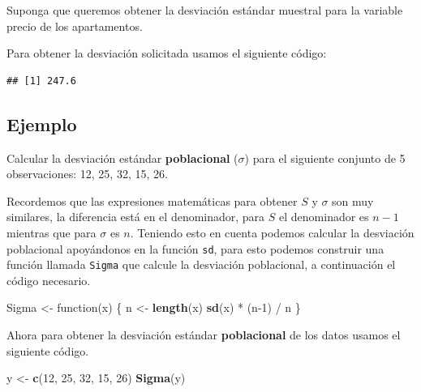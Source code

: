 \documentclass[10pt,]{krantz}
\makeatletter
\newenvironment{Shaded}{\begin{snugshade}}{\end{snugshade}}
\newcommand{\KeywordTok}[1]{\textcolor[rgb]{0.13,0.29,0.53}{\textbf{{#1}}}}
\newcommand{\DataTypeTok}[1]{\textcolor[rgb]{0.13,0.29,0.53}{{#1}}}
\newcommand{\DecValTok}[1]{\textcolor[rgb]{0.00,0.00,0.81}{{#1}}}
\newcommand{\StringTok}[1]{\textcolor[rgb]{0.31,0.60,0.02}{{#1}}}
\newcommand{\NormalTok}[1]{{#1}}
\newenvironment{kframe}{%
\medskip{}
\setlength{\fboxsep}{.8em}
 \def\at@end@of@kframe{}%
 \ifinner\ifhmode%
  \def\at@end@of@kframe{\end{minipage}}%
  \begin{minipage}{\columnwidth}%
 \fi\fi%
 \def\FrameCommand##1{\hskip\@totalleftmargin \hskip-\fboxsep
 \colorbox{shadecolor}{##1}\hskip-\fboxsep
     \hskip-\linewidth \hskip-\@totalleftmargin \hskip\columnwidth}%
 \MakeFramed {\advance\hsize-\width
   \@totalleftmargin\z@ \linewidth\hsize
   \@setminipage}}%
 {\par\unskip\endMakeFramed%
 \at@end@of@kframe}
\renewenvironment{Shaded}{\begin{kframe}}{\end{kframe}}
\makeatother
\begin{document}
Suponga que queremos obtener la desviación estándar muestral para la
variable precio de los apartamentos.

Para obtener la desviación solicitada usamos el siguiente código:

\begin{Shaded}
\end{Shaded}

\begin{verbatim}
## [1] 247.6
\end{verbatim}

\subsection*{Ejemplo}\label{ejemplo-38}


Calcular la desviación estándar \textbf{poblacional} (\(\sigma\)) para
el siguiente conjunto de 5 observaciones: 12, 25, 32, 15, 26.

Recordemos que las expresiones matemáticas para obtener \(S\) y
\(\sigma\) son muy similares, la diferencia está en el denominador, para
\(S\) el denominador es \(n-1\) mientras que para \(\sigma\) es \(n\).
Teniendo esto en cuenta podemos calcular la desviación poblacional
apoyándonos en la función \texttt{sd}, para esto podemos construir una
función llamada \texttt{Sigma} que calcule la desviación poblacional, a
continuación el código necesario.

\begin{Shaded}
\begin{Highlighting}[]
\NormalTok{Sigma <-}\StringTok{ }\NormalTok{function(x) \{}
  \NormalTok{n <-}\StringTok{ }\KeywordTok{length}\NormalTok{(x)}
  \KeywordTok{sd}\NormalTok{(x) *}\StringTok{ }\NormalTok{(n}\DecValTok{-1}\NormalTok{) /}\StringTok{ }\NormalTok{n}
\NormalTok{\} }
\end{Highlighting}
\end{Shaded}

Ahora para obtener la desviación estándar \textbf{poblacional} de los
datos usamos el siguiente código.

\begin{Shaded}
\begin{Highlighting}[]
\NormalTok{y <-}\StringTok{ }\KeywordTok{c}\NormalTok{(}\DecValTok{12}\NormalTok{, }\DecValTok{25}\NormalTok{, }\DecValTok{32}\NormalTok{, }\DecValTok{15}\NormalTok{, }\DecValTok{26}\NormalTok{)}
\KeywordTok{Sigma}\NormalTok{(y)}
\end{Highlighting}
\end{Shaded}
\end{document}
